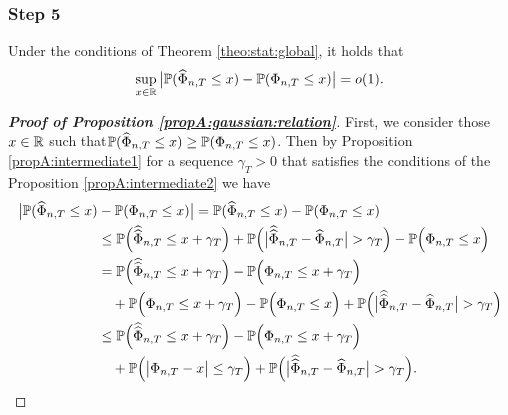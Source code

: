\documentclass[a4paper,12pt]{article}
\newcommand{\doublehattwo}[1]{\widehat{\widehat{#1}}}
\begin{document}
\subsubsection*{Step 5}
\begin{propA}\label{propA:gaussian:relation}
Under the conditions of Theorem \ref{theo:stat:global}, it holds that 
\begin{equation}\label{eqA:gaussian:relation}
\sup_{x \in \mathbb{R}} \big| \mathbb{P}(\widehat{\Phi}_{n, T} \le x) - \mathbb{P}(\Phi_{n,T} \le x) \big| = o(1).
\end{equation}
\end{propA}
\begin{proof}[\textnormal{\textbf{Proof of Proposition \ref{propA:gaussian:relation}}}] 
First, we consider those $x\in \mathbb{R}$ such that\linebreak $\mathbb{P}(\widehat{\Phi}_{n,T} \le x) \geq \mathbb{P}(\Phi_{n, T} \le x)$. Then by Proposition \ref{propA:intermediate1} for a sequence $\gamma_{T}>0$ that satisfies the conditions of the Proposition \ref{propA:intermediate2} we have
\begin{align*}
\big| \pr(\widehat{\Phi}_{n, T} \le x) &- \pr(\Phi_{n,T} \le x) \big| = \pr(\widehat{\Phi}_{n, T} \le x) - \pr(\Phi_{n,T} \le x)  \\
&\le \pr\Big(\doublehattwo{\Phi}_{n,T} \le x + \gamma_{T}\Big) + \pr \Big(\big|\doublehattwo{\Phi}_{n,T} - \widehat{\Phi}_{n,T}\big| > \gamma_{T} \Big)   - \pr\Big(\Phi_{n,T} \le x\Big)  \\
&= \pr\Big(\doublehattwo{\Phi}_{n,T} \le x + \gamma_{T}\Big) - \pr\Big(\Phi_{n,T} \le x + \gamma_{T}\Big)  \\
& \quad +  \pr\Big(\Phi_{n,T} \le x + \gamma_{T}\Big)   - \pr\Big(\Phi_{n,T} \le x\Big) + \pr \Big(\big|\doublehattwo{\Phi}_{n,T} - \widehat{\Phi}_{n,T}\big| > \gamma_{T} \Big) \\
&\le \pr\Big(\doublehattwo{\Phi}_{n,T} \le x + \gamma_{T}\Big) - \pr\Big(\Phi_{n,T} \le x + \gamma_{T}\Big) \\
&\quad + \pr\Big(\big|\Phi_{n,T} - x \big| \le \gamma_{T}\Big) + \pr \Big(\big|\doublehattwo{\Phi}_{n,T} - \widehat{\Phi}_{n,T}\big| > \gamma_{T} \Big).
\end{align*}


\end{proof}
\end{document}
